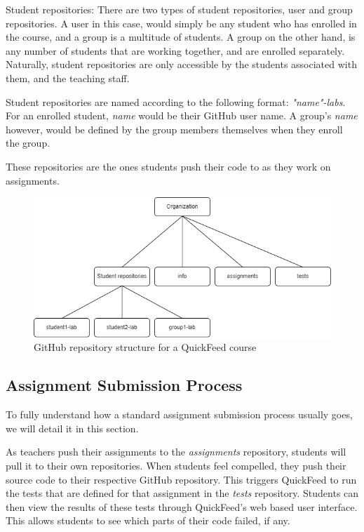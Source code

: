 Student repositories: There are two types of student repositories, user and group repositories.
A user in this case, would simply be any student who has enrolled in the course, and a group is a multitude of students.
A group on the other hand, is any number of students that are working together, and are enrolled separately.
Naturally, student repositories are only accessible by the students associated with them, and the teaching staff.

Student repositories are named according to the following format: \textit{"name"-labs}.
For an enrolled student, \textit{name} would be their GitHub user name.
A group's \textit{name} however, would be defined by the group members themselves when they enroll the group.

These repositories are the ones students push their code to as they work on assignments.

\begin{figure}[ht]
    \centering
    \includegraphics[width=\textwidth]{photos/qf-repository-structure.png}
    \caption{GitHub repository structure for a QuickFeed course}
    \label{fig:qf-repository-structure}
\end{figure}

\subsection{Assignment Submission Process}

To fully understand how a standard assignment submission process usually goes, we will detail it in this section.

As teachers push their assignments to the \textit{assignments} repository, students will pull it to their own repositories.
When students feel compelled, they push their source code to their respective GitHub repository.
This triggers QuickFeed to run the tests that are defined for that assignment in the \textit{tests} repository.
Students can then view the results of these tests through QuickFeed's web based user interface.  
This allows students to see which parts of their code failed, if any.

